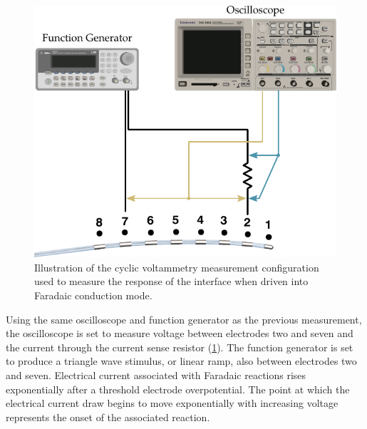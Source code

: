       \begin{figure}
        \centering
        \includegraphics{content/pt2/08-InterfaceParameters/graphics/measurement_Faradaic_setup_initial}
        \caption{\label{fig:pt2-measurement_Faradaic_setup_initial}Illustration of the cyclic voltammetry measurement configuration used to measure the response of the interface when driven into Faradaic conduction mode.}
      \end{figure}
      Using the same oscilloscope and function generator as the previous measurement, the oscilloscope is set to measure voltage between electrodes two and seven and the current through the current sense resistor (\cref{fig:pt2-measurement_Faradaic_setup_initial}).
      The function generator is set to produce a triangle wave stimulus, or linear ramp, also between electrodes two and seven.
      Electrical current associated with Faradaic reactions rises exponentially after a threshold electrode overpotential.
      The point at which the electrical current draw begins to move exponentially with increasing voltage represents the onset of the associated reaction.
